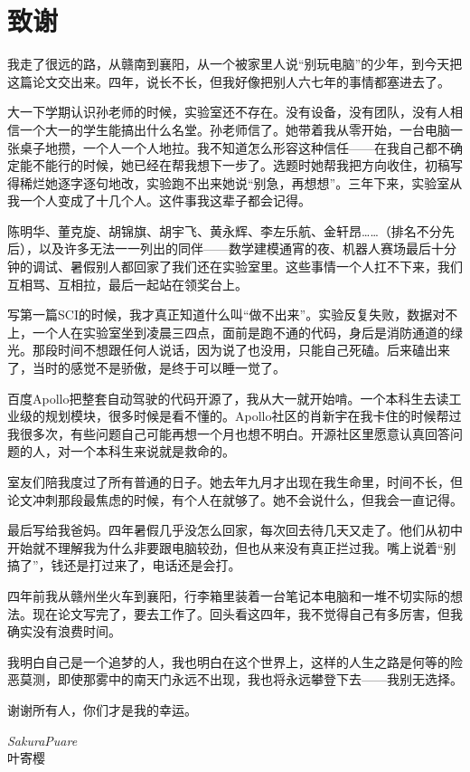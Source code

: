 {
\chapter*{致\hspace{2em}谢}

\songti

我走了很远的路，从赣南到襄阳，从一个被家里人说“别玩电脑”的少年，到今天把这篇论文交出来。四年，说长不长，但我好像把别人六七年的事情都塞进去了。

大一下学期认识孙老师的时候，实验室还不存在。没有设备，没有团队，没有人相信一个大一的学生能搞出什么名堂。孙老师信了。她带着我从零开始，一台电脑一张桌子地攒，一个人一个人地拉。我不知道怎么形容这种信任——在我自己都不确定能不能行的时候，她已经在帮我想下一步了。选题时她帮我把方向收住，初稿写得稀烂她逐字逐句地改，实验跑不出来她说“别急，再想想”。三年下来，实验室从我一个人变成了十几个人。这件事我这辈子都会记得。

陈明华、董克旋、胡锦旗、胡宇飞、黄永辉、李左乐航、金轩昂……（排名不分先后），以及许多无法一一列出的同伴——数学建模通宵的夜、机器人赛场最后十分钟的调试、暑假别人都回家了我们还在实验室里。这些事情一个人扛不下来，我们互相骂、互相拉，最后一起站在领奖台上。

写第一篇SCI的时候，我才真正知道什么叫“做不出来”。实验反复失败，数据对不上，一个人在实验室坐到凌晨三四点，面前是跑不通的代码，身后是消防通道的绿光。那段时间不想跟任何人说话，因为说了也没用，只能自己死磕。后来磕出来了，当时的感觉不是骄傲，是终于可以睡一觉了。

百度Apollo把整套自动驾驶的代码开源了，我从大一就开始啃。一个本科生去读工业级的规划模块，很多时候是看不懂的。Apollo社区的肖新宇在我卡住的时候帮过我很多次，有些问题自己可能再想一个月也想不明白。开源社区里愿意认真回答问题的人，对一个本科生来说就是救命的。

室友们陪我度过了所有普通的日子。她去年九月才出现在我生命里，时间不长，但论文冲刺那段最焦虑的时候，有个人在就够了。她不会说什么，但我会一直记得。

最后写给我爸妈。四年暑假几乎没怎么回家，每次回去待几天又走了。他们从初中开始就不理解我为什么非要跟电脑较劲，但也从来没有真正拦过我。嘴上说着“别搞了”，钱还是打过来了，电话还是会打。

四年前我从赣州坐火车到襄阳，行李箱里装着一台笔记本电脑和一堆不切实际的想法。现在论文写完了，要去工作了。回头看这四年，我不觉得自己有多厉害，但我确实没有浪费时间。

我明白自己是一个追梦的人，我也明白在这个世界上，这样的人生之路是何等的险恶莫测，即使那雾中的南天门永远不出现，我也将永远攀登下去——我别无选择。

谢谢所有人，你们才是我的幸运。

\begin{flushright}
{\itshape SakuraPuare} \\
叶寄樱
\end{flushright}
}
